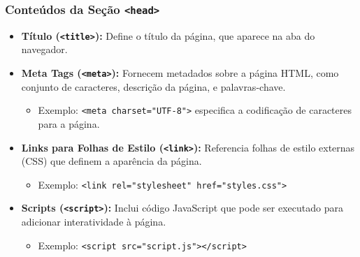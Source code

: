 \begin{frame}[fragile]
  \frametitle{Conteúdos da Seção \texttt{<head>}}
  \begin{itemize}
    \item \textbf{Título (\texttt{<title>}):} Define o título da página, que aparece na aba do navegador.
    \item \textbf{Meta Tags (\texttt{<meta>}):} Fornecem metadados sobre a página HTML, como conjunto de caracteres, descrição da página, e palavras-chave.
      \begin{itemize}
        \item Exemplo: \texttt{<meta charset="UTF-8">} especifica a codificação de caracteres para a página.
      \end{itemize}
    \item \textbf{Links para Folhas de Estilo (\texttt{<link>}):} Referencia folhas de estilo externas (CSS) que definem a aparência da página.
      \begin{itemize}
        \item Exemplo: \texttt{<link rel="stylesheet" href="styles.css">}
      \end{itemize}
    \item \textbf{Scripts (\texttt{<script>}):} Inclui código JavaScript que pode ser executado para adicionar interatividade à página.
      \begin{itemize}
        \item Exemplo: \texttt{<script src="script.js"></script>}
      \end{itemize}
  \end{itemize}
\end{frame}

